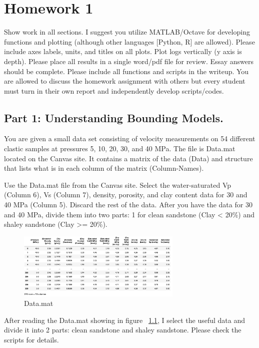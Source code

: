 
\chapter{Homework 1}
Show work in all sections. I suggest you utilize MATLAB/Octave 
for developing functions and plotting (although other languages 
[Python, R] are allowed). Please include axes labels, units, and 
titles on all plots. Plot logs vertically (y axis is depth). 
Please place all results in a single word/pdf file for review. 
Essay answers should be complete. Please include all functions 
and scripts in the writeup. You are allowed to discuss the homework 
assignment with others but every student must turn in their own 
report and independently develop scripts/codes.

\section{Part 1: Understanding Bounding Models.}
You are given a small data set consisting of velocity measurements on 
54 different clastic samples at pressures 5, 10, 20, 30, and 40 MPa. 
The file is Data.mat located on the Canvas site. 
It contains a matrix of the data (Data) and structure that lists 
what is in each column of the matrix (Column-Names).


\begin{problem}{1}
    Use the Data.mat file from the Canvas site. 
    Select the water-saturated Vp (Column 6), Vs (Column 7), 
    density, porosity, and clay content data for 30 and 40 MPa (Column 5). 
    Discard the rest of the data. After you have the data for 30 
    and 40 MPa, divide them into two parts: 1 for clean sandstone 
    (Clay < 20\%) and shaley sandstone (Clay >= 20\%).
\end{problem}

\begin{solution}
    \begin{figure}[H]
        \centering
        \includegraphics[width=0.7\textwidth]{figures/homework-1/p1-problem-1.jpg}
        \caption{Data.mat}
        \label{fig:p1-problem-1}
    \end{figure}
    After reading the Data.mat showing in figure ~\ref{fig:p1-problem-1}, I select the useful data and divide it into 2 parts: clean sandstone and shaley sandstone.
    Please check the scripts for details.
\end{solution}



